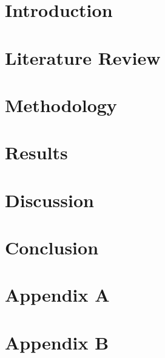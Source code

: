 \documentclass[12pt,a4paper]{report}
\begin{document}
\tableofcontents
\listoffigures
\listoftables

\chapter{Introduction}


\chapter{Literature Review}


\chapter{Methodology}


\chapter{Results}


\chapter{Discussion}


\chapter{Conclusion}


\appendix
\chapter{Appendix A}


\chapter{Appendix B}




\end{document}
